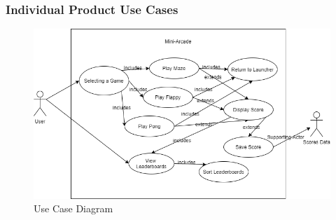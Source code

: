 \documentclass[12pt, titlepage]{article}
\begin{document}
\subsubsection{Individual Product Use Cases}

\begin{figure}[H]
    \centering
    \includegraphics[width=6in]{Images/UseCaseDiagram.png} 
    \caption{Use Case Diagram}
    \label{fig:example}
 \end{figure}
 
\end{document}
